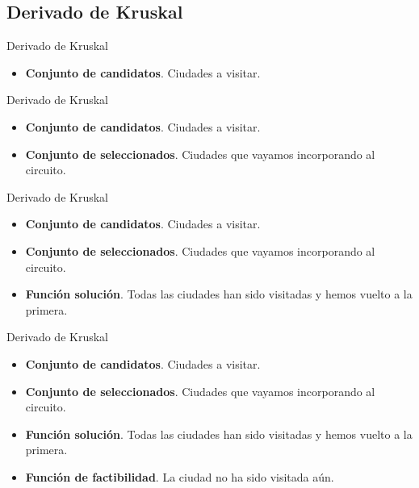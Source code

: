 \documentclass{beamer}
\begin{document}
\subsection{Derivado de Kruskal}

\begin{frame}[fragile]{Derivado de Kruskal}

\begin{itemize}
	\item \textbf{Conjunto de candidatos}. Ciudades a visitar.
\end{itemize}

\end{frame}

\begin{frame}[fragile]{Derivado de Kruskal}

\begin{itemize}
	\item \textbf{Conjunto de candidatos}. Ciudades a visitar.
	\item \textbf{Conjunto de seleccionados}. Ciudades que vayamos incorporando al circuito.
\end{itemize}

\end{frame}

\begin{frame}[fragile]{Derivado de Kruskal}

\begin{itemize}
	\item \textbf{Conjunto de candidatos}. Ciudades a visitar.
	\item \textbf{Conjunto de seleccionados}. Ciudades que vayamos incorporando al circuito.
	\item \textbf{Función solución}. Todas las ciudades han sido visitadas y hemos vuelto a la primera.
\end{itemize}

\end{frame}

\begin{frame}[fragile]{Derivado de Kruskal}

\begin{itemize}
	\item \textbf{Conjunto de candidatos}. Ciudades a visitar.
	\item \textbf{Conjunto de seleccionados}. Ciudades que vayamos incorporando al circuito.
	\item \textbf{Función solución}. Todas las ciudades han sido visitadas y hemos vuelto a la primera.
	\item \textbf{Función de factibilidad}. La ciudad no ha sido visitada aún.
\end{itemize}

\end{frame}
\end{document}
